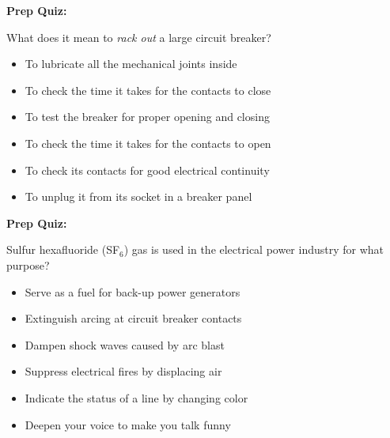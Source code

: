 \vfil \eject

\noindent
{\bf Prep Quiz:}

What does it mean to {\it rack out} a large circuit breaker?

\begin{itemize}
\item{} To lubricate all the mechanical joints inside
\vskip 5pt 
\item{} To check the time it takes for the contacts to close
\vskip 5pt 
\item{} To test the breaker for proper opening and closing
\vskip 5pt 
\item{} To check the time it takes for the contacts to open
\vskip 5pt 
\item{} To check its contacts for good electrical continuity
\vskip 5pt 
\item{} To unplug it from its socket in a breaker panel
\end{itemize}










\vfil \eject

\noindent
{\bf Prep Quiz:}

Sulfur hexafluoride (SF$_{6}$) gas is used in the electrical power industry for what purpose?

\begin{itemize}
\item{} Serve as a fuel for back-up power generators
\vskip 5pt 
\item{} Extinguish arcing at circuit breaker contacts
\vskip 5pt 
\item{} Dampen shock waves caused by arc blast
\vskip 5pt 
\item{} Suppress electrical fires by displacing air
\vskip 5pt 
\item{} Indicate the status of a line by changing color
\vskip 5pt 
\item{} Deepen your voice to make you talk funny
\end{itemize}





